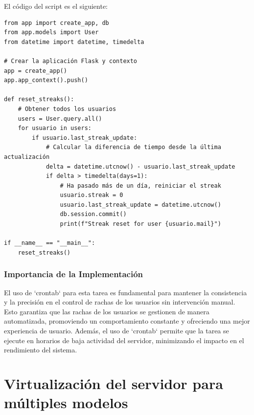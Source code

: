 \noindent
El código del script es el siguiente:


\begin{lstlisting}[caption={Script de restablecimiento de streaks en Flask}, label={lst:reset_streaks}]
from app import create_app, db
from app.models import User
from datetime import datetime, timedelta

# Crear la aplicación Flask y contexto
app = create_app()
app.app_context().push()

def reset_streaks():
    # Obtener todos los usuarios
    users = User.query.all()
    for usuario in users:
        if usuario.last_streak_update:
            # Calcular la diferencia de tiempo desde la última actualización
            delta = datetime.utcnow() - usuario.last_streak_update
            if delta > timedelta(days=1):
                # Ha pasado más de un día, reiniciar el streak
                usuario.streak = 0
                usuario.last_streak_update = datetime.utcnow()
                db.session.commit()
                print(f"Streak reset for user {usuario.mail}")

if __name__ == "__main__":
    reset_streaks()
\end{lstlisting}

\subsubsection{Importancia de la Implementación}

El uso de `crontab` para esta tarea es fundamental para mantener la consistencia y la precisión en el control de rachas de los usuarios sin intervención manual. Esto garantiza que las rachas de los usuarios se gestionen de manera automatizada, promoviendo un comportamiento constante y ofreciendo una mejor experiencia de usuario. Además, el uso de `crontab` permite que la tarea se ejecute en horarios de baja actividad del servidor, minimizando el impacto en el rendimiento del sistema.


\section{Virtualización del servidor para múltiples modelos}

